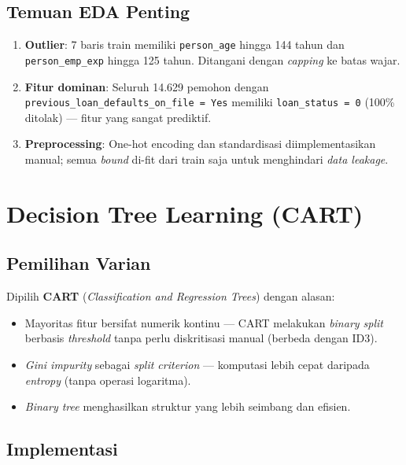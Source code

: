 \documentclass[12pt,a4paper]{article}
\begin{document}
\subsection{Temuan EDA Penting}

\begin{enumerate}
    \item \textbf{Outlier}: 7 baris train memiliki \texttt{person\_age} hingga 144 tahun dan \texttt{person\_emp\_exp} hingga 125 tahun. Ditangani dengan \textit{capping} ke batas wajar.
    \item \textbf{Fitur dominan}: Seluruh 14.629 pemohon dengan \texttt{previous\_loan\_defaults\_on\_file = Yes} memiliki \texttt{loan\_status = 0} (100\% ditolak) --- fitur yang sangat prediktif.
    \item \textbf{Preprocessing}: One-hot encoding dan standardisasi diimplementasikan manual; semua \textit{bound} di-fit dari train saja untuk menghindari \textit{data leakage}.
\end{enumerate}

\section{Decision Tree Learning (CART)}
\label{sec:dtl}

\subsection{Pemilihan Varian}

Dipilih \textbf{CART} (\textit{Classification and Regression Trees}) dengan alasan:
\begin{itemize}
    \item Mayoritas fitur bersifat numerik kontinu --- CART melakukan \textit{binary split} berbasis \textit{threshold} tanpa perlu diskritisasi manual (berbeda dengan ID3).
    \item \textit{Gini impurity} sebagai \textit{split criterion} --- komputasi lebih cepat daripada \textit{entropy} (tanpa operasi logaritma).
    \item \textit{Binary tree} menghasilkan struktur yang lebih seimbang dan efisien.
\end{itemize}

\subsection{Implementasi}
\end{document}
